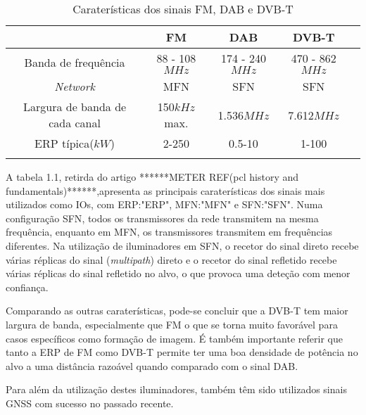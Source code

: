 \begin{table}[h]
\centering
\begin{tabular}{@{}ccccc@{}}
\toprule
                    	 & FM                & DAB     & DVB-T     \\ \midrule
Banda de frequência      & 88 - 108$MHz$   & 174 - 240$MHz$  & 470 - 862$MHz$           \\
\textit{Network}    			 & MFN   & SFN   & SFN \\
Largura de banda de cada canal    & 150$kHz$ max.      & 1.536$MHz$  & 7.612$MHz$   \\ 
ERP típica($kW$)      & 2-250         & 0.5-10    & 1-100            \\ \bottomrule
\label{tab:cara}
\end{tabular}
\caption[Caraterísticas dos sinais FM, DAB e DVB-T]{Caraterísticas dos sinais FM, DAB e DVB-T}
\end{table} 
\par
A tabela 1.1, retirda do artigo ******METER REF(pcl history and fundamentals)******,apresenta as principais caraterísticas dos sinais mais utilizados como \gls{IO}s, com ERP:"\gls{ERP}", MFN:"\gls{MFN}" e SFN:"\gls{SFN}". Numa configuração \gls{SFN}, todos os transmissores da rede transmitem na mesma frequência, enquanto em \gls{MFN}, os transmissores transmitem em frequências diferentes. Na utilização de iluminadores em \gls{SFN}, o recetor do sinal direto recebe várias réplicas do sinal (\textit{multipath}) direto e o recetor do sinal refletido recebe várias réplicas do sinal refletido no alvo, o que provoca uma deteção com menor confiança.\par 
Comparando as outras caraterísticas, pode-se concluir que a \gls{DVB-T} tem maior largura de banda, especialmente que \gls{FM} o que se torna muito favorável para casos específicos como formação de imagem. É também importante referir que tanto a \gls{ERP} de \gls{FM} como \gls{DVB-T} permite ter uma boa densidade de potência no alvo a uma distância razoável quando comparado com o sinal \gls{DAB}.\par 
Para além da utilização destes iluminadores, também têm sido utilizados sinais \gls{GNSS} com sucesso no passado recente.


